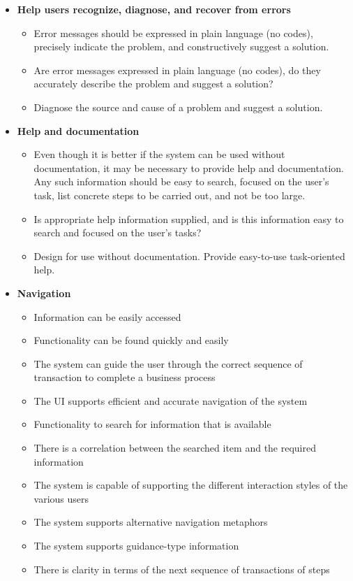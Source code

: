 \begin{itemize}
	\item \textbf{Help users recognize, diagnose, and recover from errors}
		\begin{itemize}
			\item Error messages should be expressed in plain language (no codes), precisely indicate the problem, and constructively suggest a solution.
			\item Are error messages expressed in plain language (no codes), do they accurately describe the problem and suggest a solution?
			\item Diagnose the source and cause of a problem and suggest a solution.
		\end{itemize}
		
	\item \textbf{Help and documentation}
		\begin{itemize}
			\item Even though it is better if the system can be used without documentation, it may be necessary to provide help and documentation. Any such information should be easy to search, focused on the user's task, list concrete steps to be carried out, and not be too large.
			\item Is appropriate help information supplied, and is this information easy to search and focused on the user's tasks?
			\item Design for use without documentation. Provide easy-to-use task-oriented help.
		\end{itemize}
		
	\item \textbf{Navigation}
		\begin{itemize}
			\item Information can be easily accessed
			\item Functionality can be found quickly and easily
			\item The system can guide the user through the correct sequence of transaction to complete a business process
			\item The UI supports efficient and accurate navigation of the system
			\item Functionality to search for information that is available
			\item There is a correlation between the searched item and the required information
			\item The system is capable of supporting the different interaction styles of the various users
			\item The system supports alternative navigation metaphors
			\item The system supports guidance-type information
			\item There is clarity in terms of the next sequence of transactions of steps
		\end{itemize}
	

\end{itemize}
